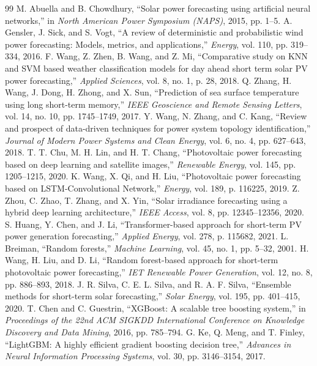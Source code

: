 \documentclass[conference]{IEEEtran}
\begin{document}
\begin{thebibliography}{99}
 M. Abuella and B. Chowdhury, ``Solar power forecasting using artificial neural networks,'' in \textit{North American Power Symposium (NAPS)}, 2015, pp. 1--5.
 A. Gensler, J. Sick, and S. Vogt, ``A review of deterministic and probabilistic wind power forecasting: Models, metrics, and applications,'' \textit{Energy}, vol. 110, pp. 319--334, 2016.
 F. Wang, Z. Zhen, B. Wang, and Z. Mi, ``Comparative study on KNN and SVM based weather classification models for day ahead short term solar PV power forecasting,'' \textit{Applied Sciences}, vol. 8, no. 1, p. 28, 2018.
 Q. Zhang, H. Wang, J. Dong, H. Zhong, and X. Sun, ``Prediction of sea surface temperature using long short-term memory,'' \textit{IEEE Geoscience and Remote Sensing Letters}, vol. 14, no. 10, pp. 1745--1749, 2017.
 Y. Wang, N. Zhang, and C. Kang, ``Review and prospect of data-driven techniques for power system topology identification,'' \textit{Journal of Modern Power Systems and Clean Energy}, vol. 6, no. 4, pp. 627--643, 2018.
 T. T. Chu, M. H. Lin, and H. T. Chang, ``Photovoltaic power forecasting based on deep learning and satellite images,'' \textit{Renewable Energy}, vol. 145, pp. 1205--1215, 2020.
 K. Wang, X. Qi, and H. Liu, ``Photovoltaic power forecasting based on LSTM-Convolutional Network,'' \textit{Energy}, vol. 189, p. 116225, 2019.
 Z. Zhou, C. Zhao, T. Zhang, and X. Yin, ``Solar irradiance forecasting using a hybrid deep learning architecture,'' \textit{IEEE Access}, vol. 8, pp. 12345--12356, 2020.
 S. Huang, Y. Chen, and J. Li, ``Transformer-based approach for short-term PV power generation forecasting,'' \textit{Applied Energy}, vol. 278, p. 115682, 2021.
 L. Breiman, ``Random forests,'' \textit{Machine Learning}, vol. 45, no. 1, pp. 5--32, 2001.
 H. Wang, H. Liu, and D. Li, ``Random forest-based approach for short-term photovoltaic power forecasting,'' \textit{IET Renewable Power Generation}, vol. 12, no. 8, pp. 886--893, 2018.
 J. R. Silva, C. E. L. Silva, and R. A. F. Silva, ``Ensemble methods for short-term solar forecasting,'' \textit{Solar Energy}, vol. 195, pp. 401--415, 2020.
 T. Chen and C. Guestrin, ``XGBoost: A scalable tree boosting system,'' in \textit{Proceedings of the 22nd ACM SIGKDD International Conference on Knowledge Discovery and Data Mining}, 2016, pp. 785--794.
 G. Ke, Q. Meng, and T. Finley, ``LightGBM: A highly efficient gradient boosting decision tree,'' \textit{Advances in Neural Information Processing Systems}, vol. 30, pp. 3146--3154, 2017.

\end{thebibliography}
\end{document}
